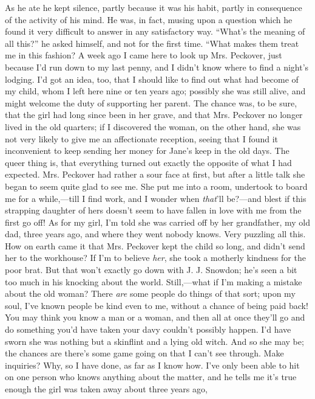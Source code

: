As he ate he kept silence, partly because it was his habit, partly in
consequence of the activity of his mind. He was, in fact, musing upon a
question which he found it very difficult to answer in any satisfactory
way. ``What's the meaning of all this?'' he asked himself, and not for
the first time. ``What makes them treat me in this fashion? A week ago I
came here to look up Mrs. Peckover, just because I'd run down to my last
penny, and I didn't know where to find a night's lodging. I'd got an
idea, too, that I should like to find out what had become of my child,
whom I left here nine or ten years ago; possibly she was still alive,
and might welcome the duty of supporting her parent. The chance was, to
be sure, that the girl had long since been in her grave, and that Mrs.
Peckover no longer lived in the old quarters; if I discovered the woman,
{}on the other hand, she was not very likely to give me an affectionate
reception, seeing that I found it inconvenient to keep sending her money
for Jane's keep in the old days. The queer thing is, that everything
turned out exactly the opposite of what I had expected. Mrs. Peckover
had rather a sour face at first, but after a little talk she began to
seem quite glad to see me. She put me into a room, undertook to board me
for a while,---till I find work, and I wonder when \emph{that}'ll
be?---and blest if this strapping daughter of hers doesn't seem to have
fallen in love with me from the first go off! As for my girl, I'm told
she was carried off by her grandfather, my old dad, three years ago, and
where they went nobody knows. Very puzzling all this. How on earth came
it that Mrs. Peckover kept the child so long, and didn't send her to the
workhouse? If I'm to believe \emph{her}, she took a motherly kindness
for the poor brat. But that won't exactly go down with J. J. Snowdon;
he's seen a bit too much in his knocking about the world. Still,---what
if I'm making a mistake about {}the old woman? There \emph{are} some
people do things of that sort; upon my soul, I've known people be kind
even to me, without a chance of being paid back! You may think you know
a man or a woman, and then all at once they'll go and do something you'd
have taken your davy couldn't possibly happen. I'd have sworn she was
nothing but a skinflint and a lying old witch. And so she may be; the
chances are there's some game going on that I can't see through. Make
inquiries? Why, so I have done, as far as I know how. I've only been
able to hit on one person who knows anything about the matter, and he
tells me it's true enough the girl was taken away about three years ago,
